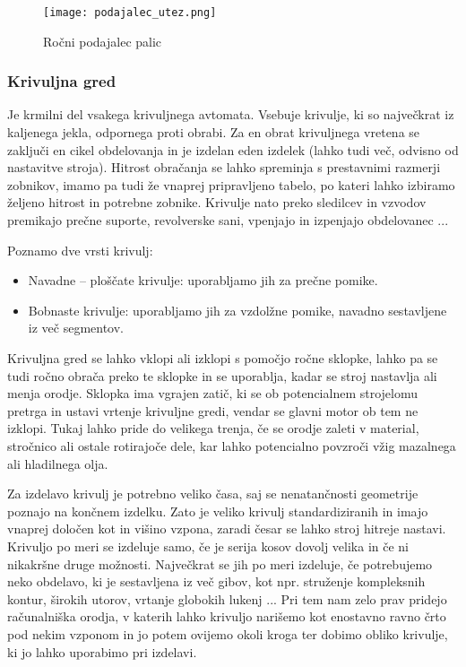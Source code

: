 \begin{figure}[H]
	\begin{center}
		\texttt{[image: podajalec\_utez.png]}
		\caption{Ročni podajalec palic
			\cite{interna}}
		\label{shema_rocnega_podajalca}
	\end{center}
\end{figure}

\subsubsection{Krivuljna gred}
Je krmilni del vsakega krivuljnega avtomata. Vsebuje krivulje,
ki so največkrat iz kaljenega jekla, odpornega proti obrabi. Za en
obrat krivuljnega vretena se zaključi en cikel obdelovanja in je
izdelan eden izdelek (lahko tudi več, odvisno od nastavitve stroja).
Hitrost obračanja se lahko spreminja s prestavnimi razmerji
zobnikov, imamo pa tudi že vnaprej pripravljeno tabelo, po kateri
lahko izbiramo željeno hitrost in potrebne zobnike. Krivulje nato
preko sledilcev in vzvodov premikajo prečne suporte,
revolverske sani, vpenjajo in izpenjajo obdelovanec ...

\noindent Poznamo dve vrsti krivulj:
\begin{itemize}
	\item Navadne -- ploščate krivulje: uporabljamo jih za prečne pomike.
	\item Bobnaste krivulje: uporabljamo jih za vzdolžne pomike, navadno
	      sestavljene iz več segmentov.
\end{itemize}

Krivuljna gred se lahko vklopi ali izklopi s pomočjo ročne sklopke,
lahko pa se tudi ročno obrača preko te sklopke in se uporablja, kadar
se stroj nastavlja ali menja orodje. Sklopka ima vgrajen
zatič, ki se ob potencialnem strojelomu pretrga in ustavi vrtenje
krivuljne gredi, vendar se glavni motor ob tem ne izklopi.
Tukaj lahko pride do velikega trenja, če se orodje zaleti v
material, stročnico ali ostale rotirajoče dele, kar lahko
potencialno povzroči vžig mazalnega ali hladilnega olja.

Za izdelavo krivulj je potrebno veliko časa, saj
se nenatančnosti geometrije poznajo na končnem izdelku. Zato je
veliko krivulj standardiziranih in imajo vnaprej določen kot in
višino vzpona, zaradi česar se lahko stroj hitreje nastavi. Krivuljo po
meri se izdeluje samo, če je serija kosov dovolj velika in če ni
nikakršne druge možnosti. Največkrat se jih po meri izdeluje,
če potrebujemo neko obdelavo, ki je sestavljena iz več gibov,
kot npr. struženje kompleksnih kontur, širokih utorov, vrtanje
globokih lukenj ... Pri tem nam zelo prav pridejo računalniška
orodja, v katerih lahko krivuljo narišemo kot enostavno ravno
črto pod nekim vzponom in jo potem ovijemo okoli kroga ter dobimo
obliko krivulje, ki jo lahko uporabimo pri izdelavi.
